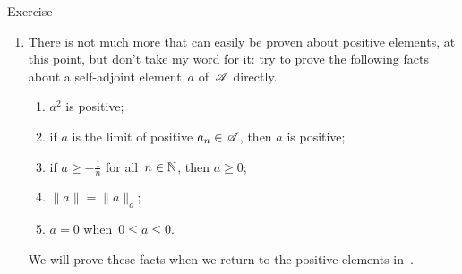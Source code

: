 \documentclass[a]{subfiles}
\begin{document}
\begin{parsec}
\begin{point}{Exercise}
\begin{enumerate}
\item
There is not much more that can easily be
proven about positive elements, at this point,
but don't take my word for it:
try to prove the following facts
about a self-adjoint element~$a$ of~$\mathscr{A}$ directly.
\begin{enumerate}
\item $a^2$ is positive;
\item if $a$ is the limit of positive $a_n\in\mathscr{A}$,
then $a$ is positive;
\item if $a\geq -\frac{1}{n}$ for all~$n\in \mathbb{N}$, then $a\geq 0$;
\item  $\|a\|=\|a\|_o$;
\item $a=0$ when~$0\leq a\leq 0$.
\end{enumerate}
We will prove these facts
when we return to the positive elements in~.
\end{enumerate}
\end{point}
\end{parsec}
\end{document}

